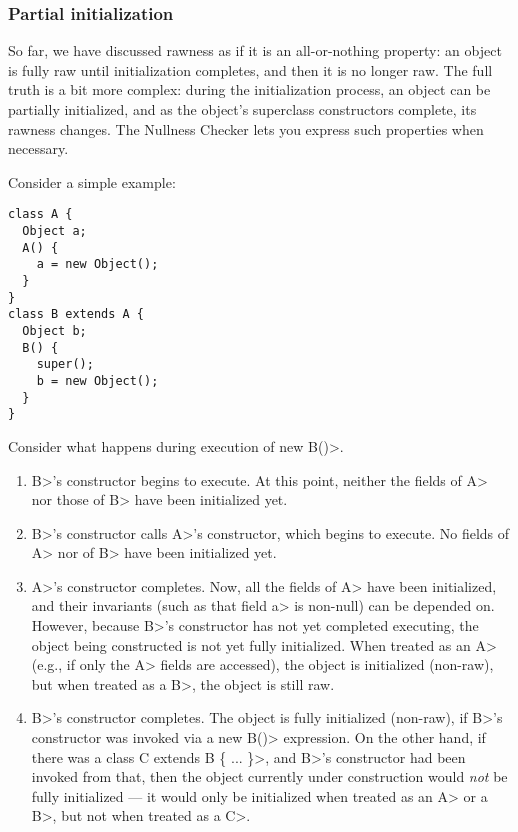 \subsubsection{Partial initialization\label{rawness-partial-initialization}}

So far, we have discussed rawness as if it is an all-or-nothing property:
an object is fully raw until initialization completes, and then it is no
longer raw.  The full truth is a bit more complex:  during the
initialization process, an object can be partially initialized, and as the
object's superclass constructors complete, its rawness changes.  The
Nullness Checker lets you express such properties when necessary.

Consider a simple example:

\begin{Verbatim}
class A {
  Object a;
  A() {
    a = new Object();
  }
}
class B extends A {
  Object b;
  B() {
    super();
    b = new Object();
  }
}
\end{Verbatim}

Consider what happens during execution of \<new B()>.

\begin{enumerate}
\item \<B>'s constructor begins to execute.  At this point, neither the
  fields of \<A> nor those of \<B> have been initialized yet.
\item \<B>'s constructor calls \<A>'s constructor, which begins to execute.
  No fields of \<A> nor of \<B> have been initialized yet.
\item \<A>'s constructor completes.  Now, all the fields of \<A> have been
  initialized, and their invariants (such as that field \<a> is non-null) can be
  depended on.  However, because \<B>'s constructor has not yet completed
  executing, the object being constructed is not yet fully initialized.
  When treated as an \<A> (e.g., if only the \<A> fields are accessed), the
  object is initialized (non-raw), but when treated as a \<B>, the object
  is still raw.
\item \<B>'s constructor completes.  The object is fully initialized
  (non-raw), if \<B>'s constructor was invoked via a \<new B()>
  expression.  On the other hand, if there was a \<class C extends B \{
  ... \}>, and \<B>'s constructor had been invoked from that, then the
  object currently under construction would \emph{not} be fully initialized
  --- it would only be initialized when treated as an \<A> or a \<B>, but
  not when treated as a \<C>.
\end{enumerate}

